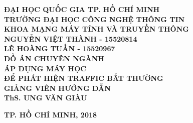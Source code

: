 \documentclass[main-report.tex]{subfiles}
\begin{document}
\begin{titlepage}
\thispagestyle{empty}
\thisfancypage{
\setlength{\fboxsep}{3pt}
\fbox}{} 
\begin{center}
{\bf\large ĐẠI HỌC QUỐC GIA TP. HỒ CHÍ MINH}\\
{\bf\subtitlesize TRƯỜNG ĐẠI HỌC CÔNG NGHỆ THÔNG TIN}\\
{\bf\subtitlesize KHOA MẠNG MÁY TÍNH VÀ TRUYỀN THÔNG}\\[4cm]

{\bf\large NGUYỄN VIỆT THÀNH - 15520814}\\
{\bf\large LÊ HOÀNG TUẤN - 15520967}\\[3.5cm]

{\bf\subtitlesize ĐỒ ÁN CHUYÊN NGÀNH}\\[0.5cm]
{\bf\LARGE ÁP DỤNG MÁY HỌC}\\
{\bf\LARGE ĐỂ PHÁT HIỆN TRAFFIC BẤT THƯỜNG}\\[5cm]

{\bf GIẢNG VIÊN HƯỚNG DẪN}\\
{\bf ThS. UNG VĂN GIÀU}
\end{center}

\vspace{3cm}
\begin{center}
{\bf TP. HỒ CHÍ MINH, 2018}
\end{center}
\end{titlepage}
\end{document}
